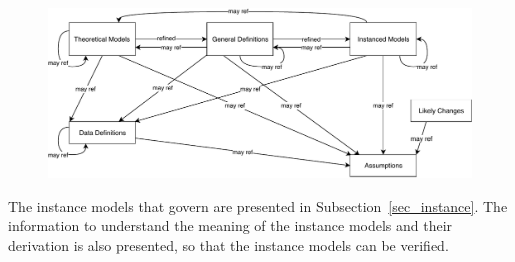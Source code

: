 \documentclass[12pt]{article}
\begin{document}



\begin{figure}[H]
  \includegraphics[scale=0.9]{RelationsBetweenTM_GD_IM_DD_A.pdf}
\end{figure}

The instance models that govern \progname{} are presented in
Subsection~\ref{sec_instance}.  The information to understand the meaning of the
instance models and their derivation is also presented, so that the instance
models can be verified.



\end{document}
